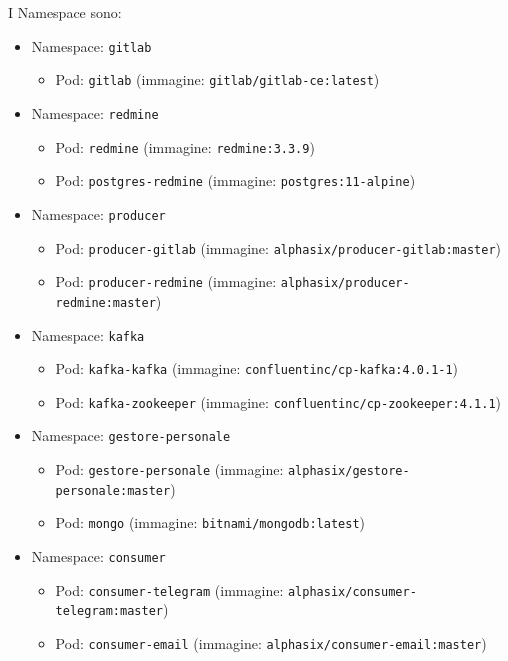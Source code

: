 I Namespace sono:
\begin{itemize}
	\item Namespace: \texttt{gitlab}
	\begin{itemize}
		\item Pod: \texttt{gitlab} (immagine: \texttt{gitlab/gitlab-ce:latest})
	\end{itemize}
	
	\item Namespace: \texttt{redmine}
	\begin{itemize}
		\item Pod: \texttt{redmine} (immagine: \texttt{redmine:3.3.9})
		\item Pod: \texttt{postgres-redmine} (immagine: \texttt{postgres:11-alpine})
	\end{itemize}
	
	\item Namespace: \texttt{producer}
	\begin{itemize}
		\item Pod: \texttt{producer-gitlab} (immagine: \texttt{alphasix/producer-gitlab:master})
		\item Pod: \texttt{producer-redmine} (immagine: \texttt{alphasix/producer-redmine:master})
	\end{itemize}
	
	\item Namespace: \texttt{kafka}
	\begin{itemize}
		\item Pod: \texttt{kafka-kafka} (immagine: \texttt{confluentinc/cp-kafka:4.0.1-1})
		\item Pod: \texttt{kafka-zookeeper} (immagine: \texttt{confluentinc/cp-zookeeper:4.1.1})
	\end{itemize}
	
	\item Namespace: \texttt{gestore-personale}
	\begin{itemize}
		\item Pod: \texttt{gestore-personale} (immagine: \texttt{alphasix/gestore-personale:master})
		\item Pod: \texttt{mongo} (immagine: \texttt{bitnami/mongodb:latest})
	\end{itemize}
	
	\item Namespace: \texttt{consumer}
	\begin{itemize}
		\item Pod: \texttt{consumer-telegram} (immagine: \texttt{alphasix/consumer-telegram:master})
		\item Pod: \texttt{consumer-email} (immagine: \texttt{alphasix/consumer-email:master})
	\end{itemize}
\end{itemize}

